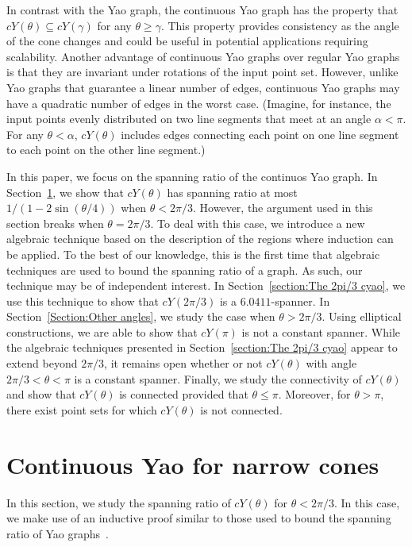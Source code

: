 \documentclass{cccg14}
\newcommand{\cyao}{\ensuremath{cY(\theta)}\xspace}
\newcommand{\cyaoangle}[1]{\ensuremath{cY(#1)}\xspace}
\newcommand{\spanningRationCyao}{\ensuremath{6.0411}\xspace}
\begin{document}
In contrast with the Yao graph, the continuous Yao graph has the property that $\cyao \subseteq \cyaoangle{\gamma}$ for any $\theta \geq \gamma$. This property provides consistency as the angle of the cone changes and could be useful in potential applications requiring scalability. Another advantage of continuous Yao graphs over regular Yao graphs is that they are invariant under rotations of the input point set. However, unlike Yao graphs that guarantee a linear number of edges, continuous Yao graphs may have a quadratic number of edges in the worst case. (Imagine, for instance, the input points evenly distributed on two line segments that meet at an angle $\alpha < \pi$. For any $\theta < \alpha$, \cyao includes edges connecting each point on one line segment to each point on the other line segment.)

In this paper, we focus on the spanning ratio of the continuos Yao graph.
In Section~\ref{section:Small cones}, we show that $\cyao$ has spanning ratio at most $1/(1-2\sin(\theta/4))$ when $\theta < 2\pi/3$. 
However, the argument used in this section breaks when $\theta = 2\pi/3$. To deal with this case, we introduce a new algebraic technique based on the description of the regions where induction can be applied.
To the best of our knowledge, this is the first time that algebraic techniques are used to bound the spanning ratio of a graph. 
As such, our technique may be of independent interest. In Section~\ref{section:The 2pi/3 cyao}, we use this technique to show that $\cyaoangle{2\pi/3}$ is a $\spanningRationCyao$-spanner.
In Section~\ref{Section:Other angles}, we study the case when $\theta>2\pi/3$. Using elliptical constructions, we are able to show that $\cyaoangle{\pi}$ is not a constant spanner. While the algebraic techniques presented in Section~\ref{section:The 2pi/3 cyao} appear to extend beyond $2\pi/3$, it remains open whether or not $\cyao$ with angle $2\pi/3 <\theta < \pi$ is a constant spanner.
Finally, we study the connectivity of $\cyao$ and show that $\cyao$ is connected provided that $\theta \leq \pi$. Moreover, for $\theta > \pi$, there exist point sets for which $\cyao$ is not connected.

\vspace{-0.5em}
\section{Continuous Yao for narrow cones}\label{section:Small cones}

In this section, we study the spanning ratio of \cyao for $\theta < 2\pi/3$. 
In this case, we make use of an inductive proof similar to those used to bound the spanning ratio of Yao graphs~\cite{barba2014new}.
\end{document}
